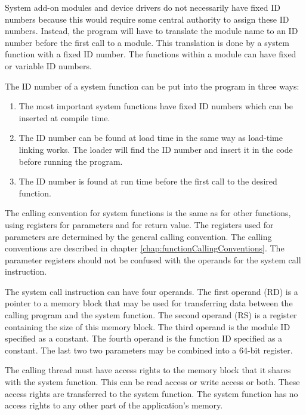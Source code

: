 \documentclass[forwardcom.tex]{subfiles}
\begin{document}
System add-on modules and device drivers do not necessarily have fixed ID numbers because this would require some central authority to assign these ID numbers. Instead, the program will have to translate the module name to an ID number before the first call to a module. This translation is done by a system function with a fixed ID number. The functions within a module can have fixed or variable ID numbers.
\vspace{2mm}

The ID number of a system function can be put into the program in three ways: 
\begin{enumerate}
\item The most important system functions have fixed ID numbers which can be inserted at compile time. 

\item The ID number can be found at load time in the same way as load-time linking works. 
The loader will find the ID number and insert it in the code before running the program. 

\item The ID number is found at run time before the first call to the desired function. 
\end{enumerate}

The calling convention for system functions is the same as for other functions, using registers for parameters and for return value. 
The registers used for parameters are determined by the general calling convention. 
The calling conventions are described in chapter \ref{chap:functionCallingConventions}.
The parameter registers should not be confused with the operands for the system call instruction. 
\vspace{2mm}

The system call instruction can have four operands. 
The first operand (RD) is a pointer to a memory block that may be used for transferring data between the calling program and the system function. The second operand (RS) is a register containing the size of this memory block.
The third operand is the module ID specified as a constant. 
The fourth operand is the function ID specified as a constant. 
The last two two parameters may be combined into a 64-bit register. 
\vspace{2mm}

The calling thread must have access rights to the memory block that it shares with the system 
function. This can be read access or write access or both. These access rights are transferred to the system function. The system function has no access rights to any other part of the application's memory.
\vspace{2mm}
\end{document}
